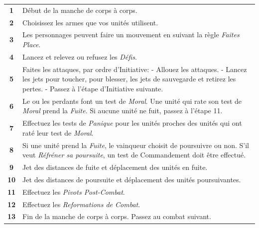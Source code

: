 \begin{table}[h!]
\begin{minipage}[t]{.55\linewidth}
\begin{tabular}{c|m{8cm}}
\textbf{1} & Début de la manche de corps à corps. \tabularnewline
\textbf{2} & Choisissez les armes que vos unités utilisent. \tabularnewline
\textbf{3} & Les personnages peuvent faire un mouvement en suivant la règle \emph{Faites Place}. \tabularnewline
\textbf{4} & Lancez et relevez ou refusez les \emph{Défis}. \tabularnewline
\textbf{5} & Faites les attaques, par ordre d'Initiative:
\newline - Allouez les attaques.
\newline - Lancez les jets pour toucher, pour blesser, les jets de sauvegarde et retirez les pertes.
\newline - Passez à l'étape d'Initiative suivante. \tabularnewline
\textbf{6} & Le ou les perdants font un test de \emph{Moral}. Une unité qui rate son test de \emph{Moral} prend la \emph{Fuite}. Si aucune unité ne fuit, passez à l'étape 11. \tabularnewline
\textbf{7} & Effectuez les tests de \emph{Panique} pour les unités proches des unités qui ont raté leur test de \emph{Moral}. \tabularnewline
\textbf{8} & Si une unité prend la \emph{Fuite}, le vainqueur choisit de poursuivre ou non. S'il veut \emph{Réfréner sa poursuite}, un test de Commandement doit être effectué. \tabularnewline
\textbf{9} & Jet des distances de fuite et déplacement des unités en fuite. \tabularnewline
\textbf{10} & Jet des distances de poursuite et déplacement des unités poursuivantes. \tabularnewline
\textbf{11} & Effectuez les \emph{Pivots Post-Combat}. \tabularnewline
\textbf{12} & Effectuez les \emph{Reformations de Combat}. \tabularnewline
\textbf{13} & Fin de la manche de corps à corps. Passez au combat suivant. \tabularnewline
\end{tabular}

\end{minipage}
\end{table}

